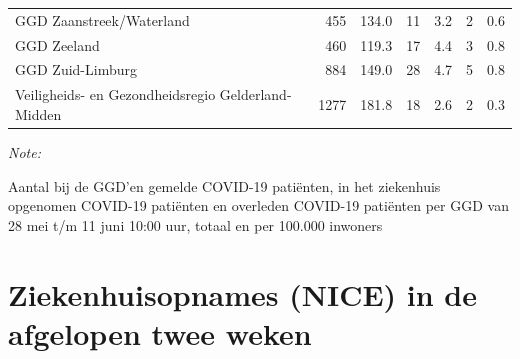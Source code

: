 \documentclass[
  english,
  man,floatsintext]{apa6}
\begin{document}
\begin{table}
\begin{threeparttable}
\begin{tabular}{lrrrrrr}
GGD Zaanstreek/Waterland & 455 & 134.0 & 11 & 3.2 & 2 & 0.6\\
GGD Zeeland & 460 & 119.3 & 17 & 4.4 & 3 & 0.8\\
GGD Zuid-Limburg & 884 & 149.0 & 28 & 4.7 & 5 & 0.8\\
Veiligheids- en Gezondheidsregio Gelderland-Midden & 1277 & 181.8 & 18 & 2.6 & 2 & 0.3\\
\bottomrule
\end{tabular}
\begin{tablenotes}
\item \textit{Note: } 
\item Aantal bij de GGD’en gemelde COVID-19 patiënten, in het ziekenhuis opgenomen COVID-19 patiënten en overleden COVID-19 patiënten per GGD van 28 mei t/m 11 juni 10:00 uur, totaal en per 100.000 inwoners
\end{tablenotes}
\end{threeparttable}
\endgroup{}
\end{table}

\newpage

\hypertarget{ziekenhuisopnames-nice-in-de-afgelopen-twee-weken}{%
\section{Ziekenhuisopnames (NICE) in de afgelopen twee weken}\label{ziekenhuisopnames-nice-in-de-afgelopen-twee-weken}}
\end{document}
